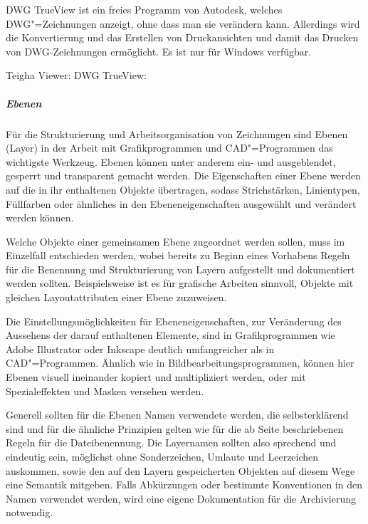 DWG TrueView ist ein freies Programm von Autodesk, welches DWG"=Zeichnungen anzeigt, ohne dass man sie verändern kann. Allerdings wird die Konvertierung und das Erstellen von Druckansichten und damit das Drucken von DWG-Zeichnungen ermöglicht. Es ist nur für Windows verfügbar.

\begin{flushleft}
	Teigha Viewer: 
	DWG TrueView: 
\end{flushleft}

\label{vektor_ebenen}
\subparagraph{Ebenen} 
Für die Strukturierung und Arbeitsorganisation von Zeichnungen sind Ebenen (Layer) in der Arbeit mit Grafikprogrammen und CAD"=Programmen das wichtigste Werkzeug. Ebenen können unter anderem ein- und ausgeblendet, gesperrt und transparent gemacht werden. Die Eigenschaften einer Ebene werden auf die in ihr enthaltenen Objekte übertragen, sodass Strichstärken, Linientypen, Füllfarben oder ähnliches in den Ebeneneigenschaften ausgewählt und verändert werden können. 

Welche Objekte einer gemeinsamen Ebene zugeordnet werden sollen, muss im Einzelfall entschieden werden, wobei bereits zu Beginn eines Vorhabens Regeln für die Benennung und Strukturierung von Layern aufgestellt und dokumentiert werden sollten. Beispielsweise ist es für grafische Arbeiten sinnvoll, Objekte mit gleichen Layoutattributen einer Ebene zuzuweisen.

Die Einstellungsmöglichkeiten für Ebeneneigenschaften, zur Veränderung des Aussehens der darauf enthaltenen Elemente, sind in Grafikprogrammen wie Adobe Illustrator oder Inkscape deutlich umfangreicher als in CAD"=Programmen. Ähnlich wie in Bildbearbeitungsprogrammen, können hier Ebenen visuell ineinander kopiert und multipliziert werden, oder mit Spezialeffekten und Masken versehen werden.

Generell sollten für die Ebenen Namen verwendete werden, die selbsterklärend sind und für die ähnliche Prinzipien gelten wie für die ab Seite \pageref{dateibenennung} beschriebenen Regeln für die Dateibenennung. Die Layernamen sollten also sprechend und eindeutig sein, möglichst ohne Sonderzeichen, Umlaute und Leerzeichen auskommen, sowie den auf den Layern gespeicherten Objekten auf diesem Wege eine Semantik mitgeben. Falls Abkürzungen oder bestimmte Konventionen in den Namen verwendet werden, wird eine eigene Dokumentation für die Archivierung notwendig.

